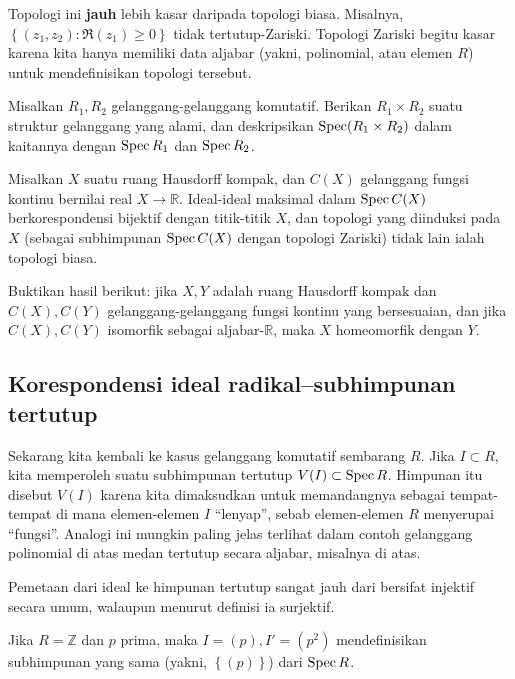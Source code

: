 \begin{example}
Topologi ini
\textbf{jauh} lebih kasar
daripada topologi biasa. Misalnya, $\left\{(z_1,z_2):
\Re(z_1) \geq 0\right\}$
tidak tertutup-Zariski. 
Topologi Zariski begitu kasar karena kita hanya memiliki data
aljabar (yakni,
polinomial, atau elemen $R$) untuk mendefinisikan topologi tersebut.
\end{example} 

\begin{exercise} 
Misalkan $R_1, R_2$ gelanggang-gelanggang komutatif. Berikan $R_1 \times R_2$ suatu
struktur gelanggang yang alami,
dan deskripsikan $\operatorname{Spec}( R_1 \times R_2)$ dalam kaitannya dengan
$\operatorname{Spec} R_1$ dan
$\operatorname{Spec} R_2$.
\end{exercise} 


\begin{exercise} 
Misalkan $X$ suatu ruang Hausdorff kompak, dan $C(X)$ gelanggang fungsi
kontinu bernilai real
$X \to \mathbb{R}$. 
Ideal-ideal maksimal dalam $\operatorname{Spec} C(X)$ berkorespondensi bijektif dengan
titik-titik $X$,
dan topologi yang diinduksi pada $X $ (sebagai subhimpunan $\operatorname{Spec} C(X)$ dengan topologi
Zariski)
tidak lain ialah topologi biasa.
\end{exercise}

\begin{exercise}
Buktikan hasil berikut: jika $X, Y$ adalah ruang Hausdorff
kompak dan $C(X),
C(Y)$ gelanggang-gelanggang fungsi kontinu yang bersesuaian, dan jika $C(X),
C(Y)$
isomorfik sebagai aljabar-$\mathbb{R}$, maka $X$ homeomorfik dengan
$Y$.
\end{exercise} 


\subsection{Korespondensi ideal radikal--subhimpunan tertutup}

Sekarang kita kembali ke kasus gelanggang komutatif sembarang $R$.
Jika $I \subset R$, kita memperoleh suatu subhimpunan tertutup
$V(I) \subset \operatorname{Spec} R$. Himpunan itu disebut $V(I)$ karena kita
dimaksudkan untuk
memandangnya sebagai tempat-tempat di mana elemen-elemen $I$ ``lenyap'',
sebab
elemen-elemen $R$ menyerupai ``fungsi''. Analogi ini mungkin
paling jelas
terlihat dalam contoh gelanggang polinomial di atas medan
tertutup secara aljabar,
misalnya  di atas.

Pemetaan dari ideal ke himpunan tertutup sangat jauh dari bersifat
injektif secara
umum, walaupun menurut definisi ia surjektif.

\begin{example} 
Jika $R = \mathbb{Z}$ dan $p$ prima, maka $I = (p), I' = (p^2)$
mendefinisikan
subhimpunan yang sama (yakni, $\left\{(p)\right\}$) dari
$\operatorname{Spec} R$. 
\end{example} 

